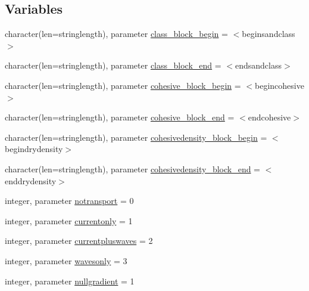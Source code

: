 \subsection*{Variables}
\begin{DoxyCompactItemize}
\item 
character(len=stringlength), parameter \mbox{\hyperlink{namespacemodulesediment_af1006e09404ecf1262d3fe43df71f09c}{class\+\_\+block\+\_\+begin}} = \textquotesingle{}$<$beginsandclass$>$\textquotesingle{}
\item 
character(len=stringlength), parameter \mbox{\hyperlink{namespacemodulesediment_aeb889ae6f0f7e8a1b9c13869a959bd1b}{class\+\_\+block\+\_\+end}} = \textquotesingle{}$<$endsandclass$>$\textquotesingle{}
\item 
character(len=stringlength), parameter \mbox{\hyperlink{namespacemodulesediment_a97728c336ac59fb7fa2d88989aa0f05a}{cohesive\+\_\+block\+\_\+begin}} = \textquotesingle{}$<$begincohesive$>$\textquotesingle{}
\item 
character(len=stringlength), parameter \mbox{\hyperlink{namespacemodulesediment_a6483adc6b7baa8b84f61b08324b816c6}{cohesive\+\_\+block\+\_\+end}} = \textquotesingle{}$<$endcohesive$>$\textquotesingle{}
\item 
character(len=stringlength), parameter \mbox{\hyperlink{namespacemodulesediment_a8d61754f94665f221210ebc1bd20e115}{cohesivedensity\+\_\+block\+\_\+begin}} = \textquotesingle{}$<$begindrydensity$>$\textquotesingle{}
\item 
character(len=stringlength), parameter \mbox{\hyperlink{namespacemodulesediment_ac4c06599ecc092000b8f90f8c4eb9f07}{cohesivedensity\+\_\+block\+\_\+end}} = \textquotesingle{}$<$enddrydensity$>$\textquotesingle{}
\item 
integer, parameter \mbox{\hyperlink{namespacemodulesediment_aaf552a5be9caf9b6291f624b0a24fb3a}{notransport}} = 0
\item 
integer, parameter \mbox{\hyperlink{namespacemodulesediment_a3f144798ab083396919e5839e34e0bf8}{currentonly}} = 1
\item 
integer, parameter \mbox{\hyperlink{namespacemodulesediment_a1bd4574819c8845169f3b29052ce4e60}{currentpluswaves}} = 2
\item 
integer, parameter \mbox{\hyperlink{namespacemodulesediment_ac5c33200eb0ff8772d6e61ec1a22ce5e}{wavesonly}} = 3
\item 
integer, parameter \mbox{\hyperlink{namespacemodulesediment_a4d4d024c00a9eac5f794d6a0db4faafd}{nullgradient}} = 1
\item 

\end{DoxyCompactItemize}

